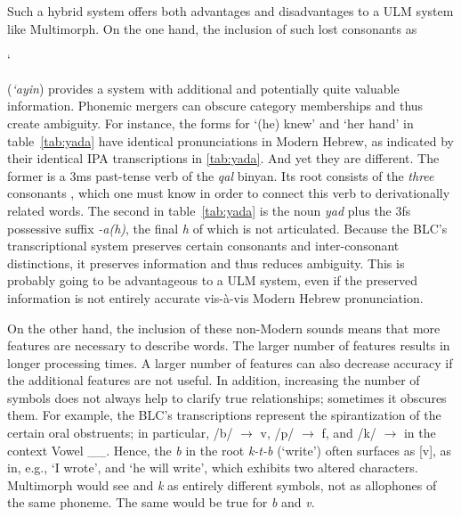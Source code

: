 Such a hybrid system offers both advantages and disadvantages to a 
\ac{ULM} system like Multimorph. 
On the one hand, the inclusion of such lost consonants as 
\begin{cjhebrew}`\end{cjhebrew} 
(\textit{`ayin}) provides a system with additional and potentially 
quite valuable information. 
Phonemic mergers can obscure category memberships and thus 
create ambiguity. For instance, 
the forms for `(he) knew' and `her hand' in  table~\ref{tab:yada}
have identical pronunciations in Modern Hebrew, as indicated 
by their identical \ac{IPA} transcriptions
in \ref{tab:yada}. And yet they are different. 
The former is a 3ms past-tense verb of the 
\emph{qal} binyan. Its root consists of the \emph{three}
consonants \textit{}, which one must 
know in order 
to connect this verb to derivationally related words. 
The second \textipa{[yad\`{a}]} 
in table~\ref{tab:yada} is the noun \textit{yad} plus 
the 3fs possessive suffix 
\textit{-a(h)}, the final \emph{h} of which is not articulated. 
Because the \ac{BLC}'s transcriptional system preserves 
certain consonants and 
inter-consonant distinctions, it preserves information and 
thus reduces ambiguity. 
This is probably going to be advantageous to a \ac{ULM} 
system, even if the preserved 
information is not entirely accurate vis-\`{a}-vis Modern Hebrew 
pronunciation.

On the other hand, the inclusion of these non-Modern 
sounds means that more features are necessary to describe 
words. The larger number of features results in longer processing times. 
A larger number of features can also decrease accuracy 
if the additional features are not useful. 
In addition, increasing the number of symbols does not 
always help to clarify true relationships; sometimes it 
obscures them. For example, the BLC's transcriptions 
represent the spirantization of the certain oral obstruents; 
in particular, /b/ $\to$ v, /p/ $\to$ f, and /k/ $\to$  
in the context
Vowel \_\_. Hence, the \textit{b} in the root \textit{k-t-b} 
(`write') often surfaces as [v], as in, e.g.,  
`I wrote', and 
 `he will write', which exhibits 
two altered characters. Multimorph would see \textit{} 
and \textit{k} as 
entirely different symbols, not as allophones
of the same phoneme. The same would be true for \textit{b} 
and \textit{v}.  


